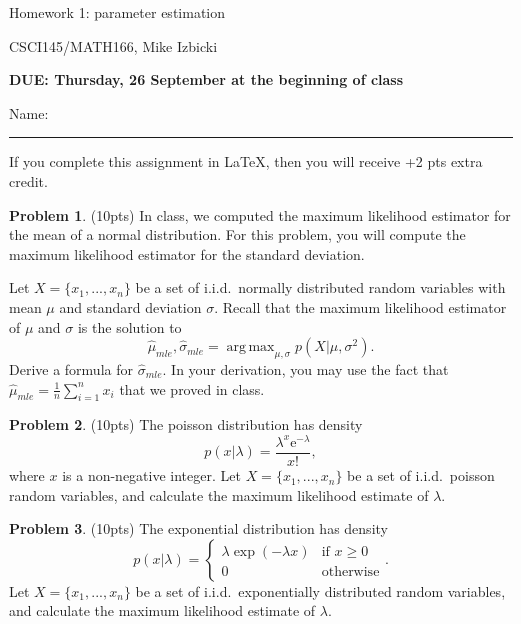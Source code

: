 \documentclass[10pt]{article}
\theoremstyle{definition}
\newtheorem{problem}{Problem}
\DeclareMathOperator*{\argmax}{arg\,max}
\newcommand{\mle}[1]{\hat{#1}_{\textit{mle}}}
\begin{document}
\begin{center}
    {
\Large
Homework 1: parameter estimation
}

    \vspace{0.1in}
CSCI145/MATH166, Mike Izbicki

    \vspace{0.1in}
    \textbf{DUE: Thursday, 26 September at the beginning of class}

    \vspace{0.1in}
\end{center}

\vspace{0.25in}
\noindent
Name: 

\noindent
\rule{\textwidth}{0.1pt}
\vspace{0.05in}

\noindent
If you complete this assignment in \LaTeX, then you will receive +2 pts extra credit.

\begin{problem}
    (10pts) 
    In class, we computed the maximum likelihood estimator for the mean of a normal distribution.
    For this problem, you will compute the maximum likelihood estimator for the standard deviation.

    Let $X=\{x_1,...,x_n\}$ be a set of i.i.d.\ normally distributed random variables with mean $\mu$ and standard deviation $\sigma$.
    Recall that the maximum likelihood estimator of $\mu$ and $\sigma$ is the solution to
    \begin{equation}
        \mle\mu, \mle\sigma = \argmax_{\mu,\sigma} p(X | \mu, \sigma^2).
    \end{equation}
    Derive a formula for $\mle\sigma$.
    In your derivation, you may use the fact that $\mle\mu = \tfrac1n\sum_{i=1}^n x_i$ that we proved in class.
\end{problem}

\newpage
\begin{problem}
    \label{prob:poisson}
    (10pts) 
    The poisson distribution has density
    \begin{equation}
        p(x|\lambda) = \frac{\lambda^x \mathrm{e}^{-\lambda}}{x!}
        ,
    \end{equation}
    where $x$ is a non-negative integer.
    Let $X=\{x_1,...,x_n\}$ be a set of i.i.d.\ poisson random variables,
    and calculate the maximum likelihood estimate of $\lambda$.
\end{problem}

\newpage
\begin{problem}
    (10pts) 
    The exponential distribution has density
    \begin{equation}
        p(x|\lambda) =
        \begin{cases}
            \lambda \exp(-\lambda x) & \text{if $x\ge0$} \\
            0 & \text{otherwise}
        \end{cases}
        .
    \end{equation}
    Let $X=\{x_1,...,x_n\}$ be a set of i.i.d.\ exponentially distributed random variables,
    and calculate the maximum likelihood estimate of $\lambda$.
\end{problem}
\end{document}
